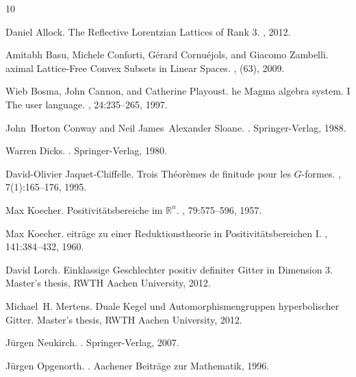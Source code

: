 \documentclass[10pt, preprint]{elsarticle}
\theoremstyle{definition}
\theoremstyle{definition}
\begin{document}
\begin{thebibliography}{10}

Daniel Allock.
\newblock The {R}eflective {L}orentzian {L}attices of {R}ank $3$.
, 2012.

Amitabh Basu, Michele Conforti, G\'erard Cornu\'ejols, and Giacomo Zambelli.
aximal {L}attice-{F}ree {C}onvex {S}ubsets in {L}inear {S}paces.
, (63), 2009.

Wieb Bosma, John Cannon, and Catherine Playoust.
he {M}agma algebra system. {I} {T}he user language.
, 24:235--265, 1997.

John~Horton Conway and Neil James~Alexander Sloane.
.
\newblock Springer-Verlag, 1988.

Warren Dicks.
.
\newblock Springer-Verlag, 1980.

David-Olivier Jaquet-Chiffelle.
\newblock Trois {T}h\'eor\`emes de finitude pour les {$G$}-formes.
,
  7(1):165--176, 1995.

Max Koecher.
\newblock Positivit\"{a}tsbereiche im $\mathbb{R}^n$.
, 79:575--596, 1957.

Max Koecher.
eitr\"age zu einer {R}eduktionstheorie in
  {P}ositivit\"{a}tsbereichen {I}.
, 141:384--432, 1960.

David Lorch.
\newblock Einklassige {G}eschlechter positiv definiter {G}itter in {D}imension
  $3$.
\newblock Master's thesis, RWTH Aachen University, 2012.

Michael~H. Mertens.
\newblock Duale {K}egel und {A}utomorphismengruppen hyperbolischer {G}itter.
\newblock Master's thesis, RWTH Aachen University, 2012.

J\"{u}rgen Neukirch.
.
\newblock Springer-Verlag, 2007.

J\"urgen Opgenorth.
.
\newblock Aachener Beitr\"age zur Mathematik, 1996.


\end{thebibliography}
\end{document}
